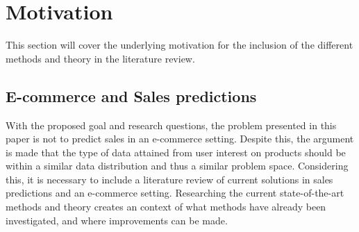 \section{Motivation}
\label{section:BT:Motivation}

This section will cover the underlying motivation for the inclusion of the different methods and theory in the literature review.



\subsection{E-commerce and Sales predictions}
With the proposed goal and research questions, the problem presented in this paper is not to predict sales in an e-commerce setting.
Despite this, the argument is made that the type of data attained from user interest on products should be within a similar data distribution and thus a similar problem space.
Considering this, it is necessary to include a literature review of current solutions in sales predictions and an e-commerce setting.
Researching the current state-of-the-art methods and theory creates an context of what methods have already been investigated,
and where improvements can be made. 


